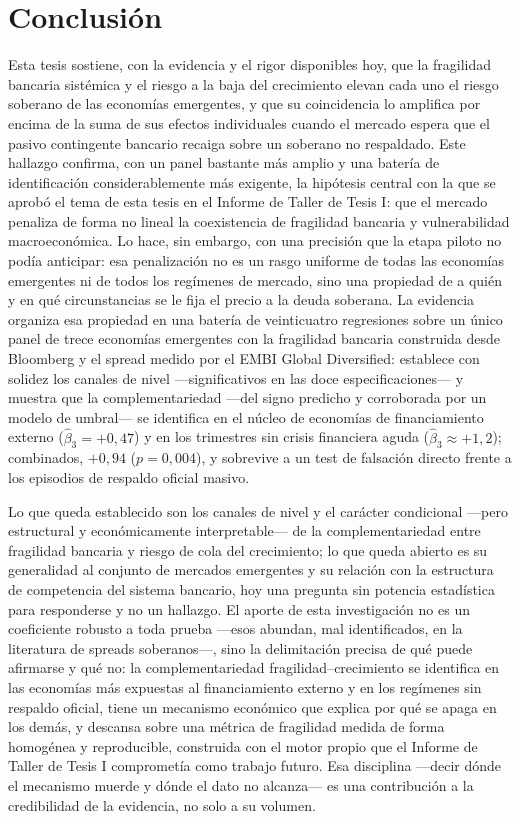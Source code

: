 \section{Conclusión}

Esta tesis sostiene, con la evidencia y el rigor disponibles hoy, que la fragilidad bancaria sistémica y el riesgo a la baja del crecimiento elevan cada uno el riesgo soberano de las economías emergentes, y que su coincidencia lo amplifica por encima de la suma de sus efectos individuales cuando el mercado espera que el pasivo contingente bancario recaiga sobre un soberano no respaldado. Este hallazgo confirma, con un panel bastante más amplio y una batería de identificación considerablemente más exigente, la hipótesis central con la que se aprobó el tema de esta tesis en el Informe de Taller de Tesis I: que el mercado penaliza de forma no lineal la coexistencia de fragilidad bancaria y vulnerabilidad macroeconómica. Lo hace, sin embargo, con una precisión que la etapa piloto no podía anticipar: esa penalización no es un rasgo uniforme de todas las economías emergentes ni de todos los regímenes de mercado, sino una propiedad de a quién y en qué circunstancias se le fija el precio a la deuda soberana. La evidencia organiza esa propiedad en una batería de veinticuatro regresiones sobre un único panel de trece economías emergentes con la fragilidad bancaria construida desde Bloomberg y el spread medido por el EMBI Global Diversified: establece con solidez los canales de nivel —significativos en las doce especificaciones— y muestra que la complementariedad —del signo predicho y corroborada por un modelo de umbral— se identifica en el núcleo de economías de financiamiento externo ($\hat\beta_3=+0{,}47$) y en los trimestres sin crisis financiera aguda ($\hat\beta_3\approx+1{,}2$); combinados, $+0{,}94$ ($p=0{,}004$), y sobrevive a un test de falsación directo frente a los episodios de respaldo oficial masivo.

Lo que queda establecido son los canales de nivel y el carácter condicional —pero estructural y económicamente interpretable— de la complementariedad entre fragilidad bancaria y riesgo de cola del crecimiento; lo que queda abierto es su generalidad al conjunto de mercados emergentes y su relación con la estructura de competencia del sistema bancario, hoy una pregunta sin potencia estadística para responderse y no un hallazgo. El aporte de esta investigación no es un coeficiente robusto a toda prueba —esos abundan, mal identificados, en la literatura de spreads soberanos—, sino la delimitación precisa de qué puede afirmarse y qué no: la complementariedad fragilidad--crecimiento se identifica en las economías más expuestas al financiamiento externo y en los regímenes sin respaldo oficial, tiene un mecanismo económico que explica por qué se apaga en los demás, y descansa sobre una métrica de fragilidad medida de forma homogénea y reproducible, construida con el motor propio que el Informe de Taller de Tesis I comprometía como trabajo futuro. Esa disciplina —decir dónde el mecanismo muerde y dónde el dato no alcanza— es una contribución a la credibilidad de la evidencia, no solo a su volumen.
